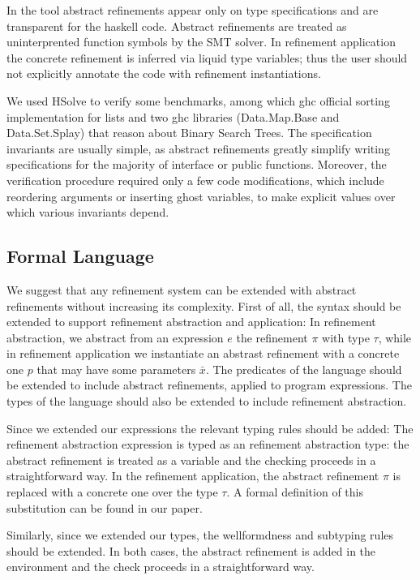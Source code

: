 In the tool abstract refinements appear only on type specifications
and are transparent for the haskell code.
Abstract refinements are treated as uninterprented function
symbols by the SMT solver. 
In refinement application the concrete refinement is inferred via liquid 
type variables; thus the user should not explicitly annotate the code with refinement instantiations.

We used HSolve to verify 
some benchmarks, among which ghc official sorting implementation for lists
and two ghc libraries (Data.Map.Base and Data.Set.Splay) that reason about Binary Search Trees.
The specification invariants are usually simple, as abstract refinements
greatly simplify writing specifications for the majority of interface or public functions.
Moreover, the verification procedure required only a few code modifications, 
which include reordering arguments or inserting ghost variables, 
to make explicit values over which various invariants depend.

\subsection{Formal Language}
We suggest that any refinement system can be extended with abstract refinements
without increasing its complexity.
%
First of all, the syntax should be extended to support refinement abstraction
and application:		
In refinement abstraction, we abstract from an expression $e$
the refinement $\pi$ with type $\tau$, while in refinement application
we instantiate an abstrast refinement with a concrete one $p$
that may have some parameters $\bar{x}$.
%
The predicates of the language should be extended to 
include abstract refinements, applied to program expressions.
%
The types of the language should also be extended to include 
refinement abstraction.
%

Since we extended our expressions the relevant typing rules should be added:
The refinement abstraction expression is typed as an refinement abstraction
type: the abstract refinement is treated as a variable
and the checking proceeds in a straightforward way.
In the refinement application, the abstract refinement $\pi$ is replaced with a concrete one
over the type $\tau$. A formal definition of this substitution can be found in our paper.

Similarly, since we extended our types, the wellformdness and subtyping 
rules should be extended.
In both cases, the abstract refinement is added in the environment
and the check proceeds in a straightforward way.

